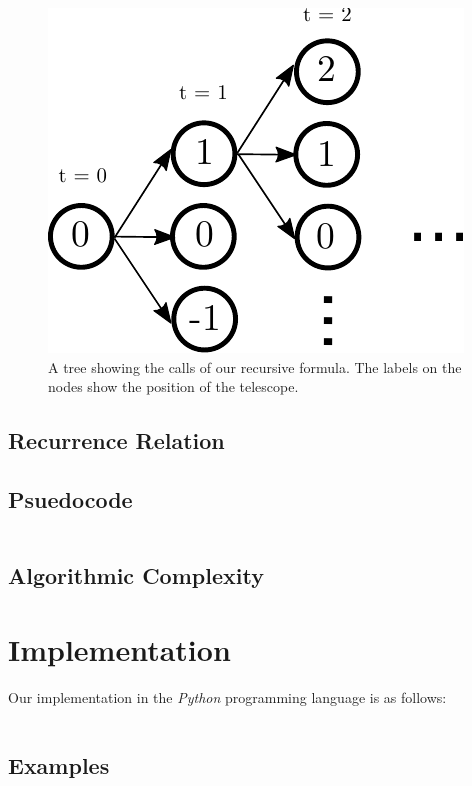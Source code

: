 \documentclass[titlepage,12pt]{article}
\begin{document}
\begin{figure}[H]
    \begin{center}
    \includegraphics[width=0.5\linewidth]{dp_recursive}
    \end{center}
    \label{recursive}
    \caption{A tree showing the calls of our recursive formula. The
    labels on the nodes show the position of the telescope.}
\end{figure}

\subsection{Recurrence Relation}


\subsection{Psuedocode}

\inputminted{python3}{dp.py}

\subsection{Algorithmic Complexity}


\section{Implementation}

Our implementation in the \emph{Python} programming language is as follows:

\inputminted{python3}{dp.py}

\subsection{Examples}


\end{document}
